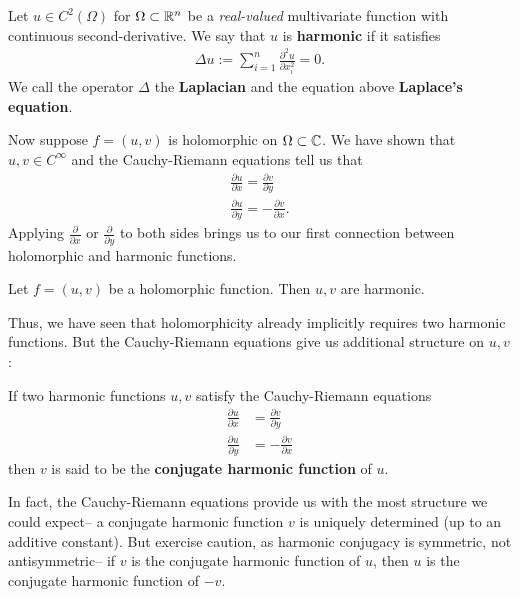 \documentclass{memoir}
\begin{document}


\begin{defn}
	Let \(u \in C^2(\Omega)\) for \(\Omega\subset \mathbb{R}^{n}\) be a \textit{real-valued} multivariate function with continuous second-derivative. We say that \(u\) is \textbf{harmonic} if it satisfies
	\begin{align*}
		\Delta u := \sum_{i=1}^{n} \frac{\partial^2 u}{\partial x_i^2} = 0.
	\end{align*}
	We call the operator \(\Delta \) the \textbf{Laplacian} and the equation above \textbf{Laplace's equation}.
\end{defn}
Now suppose \(f = (u,v)\) is holomorphic on \(\Omega \subset \mathbb{C}\). We have shown that \(u,v \in C^{\infty}\) and the Cauchy-Riemann equations tell us that
\begin{align*}
	\frac{\partial u}{\partial x} = \frac{\partial v}{\partial y} \\
	\frac{\partial u}{\partial y} = - \frac{\partial v}{\partial x} .
\end{align*}
Applying \(\frac{\partial }{\partial x} \) or \(\frac{\partial }{\partial y} \) to both sides brings us to our first connection between holomorphic and harmonic functions.

\begin{thm}
	Let \(f=(u,v)\) be a holomorphic function. Then \(u,v\) are harmonic.
\end{thm}

Thus, we have seen that holomorphicity already implicitly requires two harmonic functions. But the Cauchy-Riemann equations give us additional structure on \(u,v\):

\begin{defn}
	If two harmonic functions \(u,v\) satisfy the Cauchy-Riemann equations
\begin{align*}
	\frac{\partial u}{\partial x} &= \frac{\partial v}{\partial y} \\
	\frac{\partial u}{\partial y} &= - \frac{\partial v}{\partial x} 
\end{align*}
	then \(v\) is said to be the \textbf{conjugate harmonic function} of \(u\). 
\end{defn}
In fact, the Cauchy-Riemann equations provide us with the most structure we could expect-- a conjugate harmonic function \(v\) is uniquely determined (up to an additive constant). But exercise caution, as harmonic conjugacy is symmetric, not antisymmetric-- if \(v\) is the conjugate harmonic function of \(u\), then \(u\) is the conjugate harmonic function of \(-v\).\\
\end{document}
